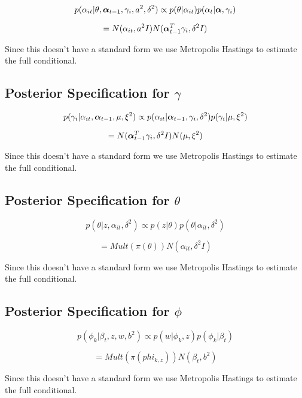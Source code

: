 \documentclass[a4paper]{article}
\begin{document}
\[p(\alpha_{it} | \theta, \text{\boldmath$\alpha$}_{t-1}, \gamma_i, a^2, \delta^2) \propto p(\theta | \alpha_{it}) p(\alpha_t | \text{\boldmath$\alpha$}, \gamma_i)\]

\[= N(\alpha_{it}, a^2I) N(\text{\boldmath$\alpha$}_{t-1}^T \gamma_i, \delta^2I)\]

Since this doesn't have a standard form we use Metropolis Hastings to estimate the full conditional.

\subsection{Posterior Specification for $\gamma$}

\[p(\gamma_i | \alpha_{it}, \text{\boldmath$\alpha$}_{t-1}, \mu, \xi^2) \propto p(\alpha_{it} | \text{\boldmath$\alpha$}_{t-1}, \gamma_i, \delta^2) p(\gamma_i | \mu, \xi^2)\]

\[= N(\text{\boldmath$\alpha$}_{t-1}^T \gamma_i, \delta^2I)N(\mu, \xi^2)\]

Since this doesn't have a standard form we use Metropolis Hastings to estimate the full conditional.

\subsection{Posterior Specification for $\theta$}

\[p(\theta | z, \alpha_{it}, \delta^2) \propto p(z | \theta) p(\theta | \alpha_{it}, \delta^2)\]

\[= Mult(\pi(\theta)) N(\alpha_{it}, \delta^2I)\]

Since this doesn't have a standard form we use Metropolis Hastings to estimate the full conditional.

\subsection{Posterior Specification for $\phi$}

\[p(\phi_k | \beta_t, z, w, b^2) \propto p(w | \phi_k, z) p(\phi_k | \beta_t)\]

\[= Mult(\pi(phi_{k,z})) N(\beta_t, b^2)\]

Since this doesn't have a standard form we use Metropolis Hastings to estimate the full conditional.
\end{document}
